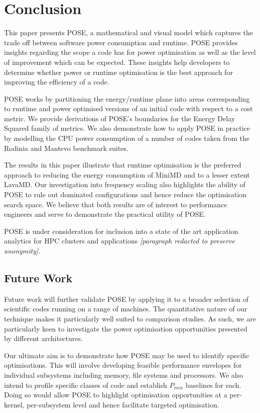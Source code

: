 \section{Conclusion}
\label{sec:conclusion}
\noindent
This paper presents POSE, a mathematical and visual model which captures the trade off between software power consumption and runtime.
POSE provides insights regarding the scope a code has for power optimisation as well as the level of improvement which can be expected.
These insights help developers to determine whether power or runtime optimisation is the best approach for improving the efficiency of a code.

POSE works by partitioning the energy/runtime plane into areas corresponding to runtime and power optimised versions of an initial code with respect to a cost metric.
We provide derivations of POSE's boundaries for the Energy Delay Squared family of metrics.
We also demonstrate how to apply POSE in practice by modelling the CPU power consumption of a number of codes taken from the Rodinia and Mantevo benchmark suites.  

The results in this paper illustrate that runtime optimisation is the preferred approach to reducing the energy consumption of MiniMD and to a lesser extent LavaMD.
Our investigation into frequency scaling also highlights the ability of POSE to rule out dominated configurations and hence reduce the optimisation search space.
We believe that both results are of interest to performance engineers and serve to demonstrate the practical utility of POSE.

POSE is under consideration for inclusion into a state of the art application analytics for HPC clusters and applications \textit{[paragraph redacted to preserve anonymity]}.

\subsection*{Future Work}
\noindent
Future work will further validate POSE by applying it to a broader selection of scientific codes running on a range of machines.
The quantitative nature of our technique makes it particularly well suited to comparison studies.
As such, we are particularly keen to investigate the power optimisation opportunities presented by different architectures.

Our ultimate aim is to demonstrate how POSE may be used to identify specific optimisations.
This will involve developing feasible performance envelopes for individual subsystems including memory, file systems and processors. 
We also intend to profile specific classes of code and establish $P_{min}$ baselines for each.
Doing so would allow POSE to highlight optimisation opportunities at a per-kernel, per-subsystem level and hence facilitate targeted optimisation.
